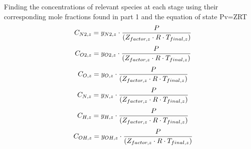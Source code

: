 \documentclass[10pt,fleqn]{article}
\newcommand{\I}{\mbox{\hspace{0.20in}}}
\begin{document}
\vspace{0.04in}
\noindent
\rm Finding the concentrations of relevant species at each stage using their corresponding mole fractions found in part 1 and the equation of state Pv=ZRT
\begin{equation}
\I \label{EES Eqn:90}
C_{N2,z} = y_{N2,z}  \cdot  \frac {P}{  \left( Z_{factor,z} \cdot  R \cdot  T_{final,z} \right)  } 
\end{equation}
\begin{equation}
\I \label{EES Eqn:91}
C_{O2,z} = y_{O2,z}  \cdot  \frac {P}{  \left( Z_{factor,z} \cdot  R \cdot  T_{final,z} \right)  } 
\end{equation}
\begin{equation}
\I \label{EES Eqn:92}
C_{O,z}   = y_{O,z}    \cdot  \frac {P}{  \left( Z_{factor,z} \cdot  R \cdot  T_{final,z} \right)  } 
\end{equation}
\begin{equation}
\I \label{EES Eqn:93}
C_{N,z}   = y_{N,z}    \cdot  \frac {P}{  \left( Z_{factor,z} \cdot  R \cdot  T_{final,z} \right)  } 
\end{equation}
\begin{equation}
\I \label{EES Eqn:94}
C_{H,z}   = y_{H,z}    \cdot  \frac {P}{  \left( Z_{factor,z} \cdot  R \cdot  T_{final,z} \right)  } 
\end{equation}
\begin{equation}
\I \label{EES Eqn:95}
C_{OH,z} = y_{OH,z} \cdot  \frac {P}{  \left( Z_{factor,z} \cdot  R \cdot  T_{final,z} \right)  } 
\end{equation}
\end{document}
